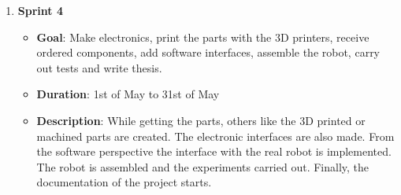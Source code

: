 \begin{enumerate}
\begin{itemize}
    \end{itemize}
  \item \textbf{Sprint 4}
    \begin{itemize}
      \item \textbf{Goal}: Make electronics, print the parts with the 3D printers, receive ordered components, add software interfaces, assemble the robot, carry out tests and write thesis.
      \item \textbf{Duration}: 1st of May to 31st of May
      \item \textbf{Description}: While getting the parts, others like the 3D printed or machined parts are created. The electronic interfaces are also made. From the software perspective the interface with the real robot is implemented. The robot is assembled and the experiments carried out. Finally, the documentation of the project starts.
    \end{itemize}

\end{enumerate}

